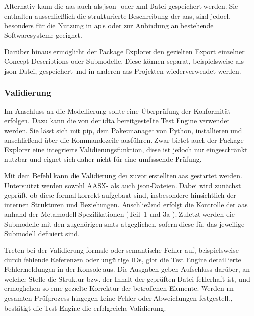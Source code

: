 Alternativ kann die \acs{aas} auch als \ac{json}- oder \ac{xml}-Datei gespeichert werden.
Sie enthalten ausschließlich die strukturierte Beschreibung der \acs{aas}, sind jedoch besonders für die Nutzung in \acsp{api} oder zur Anbindung an bestehende Softwaresysteme geeignet.

Darüber hinaus ermöglicht der Package Explorer den gezielten Export einzelner Concept Descriptions oder \mbox{Submodelle}.
Diese können separat, beispielsweise als \acs{json}-Datei, gespeichert und in anderen \acs{aas}-Projekten wiederverwendet werden.

\subsubsection{Validierung}

Im Anschluss an die Modellierung sollte eine Überprüfung der Konformität erfolgen. 
Dazu kann die von der \acs{idta} bereitgestellte Test Engine \cite{TestEngine} verwendet werden. 
Sie lässt sich mit pip, dem Paketmanager von Python, installieren und anschließend über die Kommandozeile ausführen. 
Zwar bietet auch der Package Explorer eine integrierte Validierungsfunktion, diese ist jedoch nur eingeschränkt nutzbar und eignet sich daher nicht für eine umfassende Prüfung.

Mit dem Befehl 
kann die Validierung der zuvor erstellten \acs{aas} gestartet werden.
Unterstützt werden sowohl AASX- als auch \acs{json}-Dateien. 
Dabei wird zunächst geprüft, ob diese formal korrekt aufgebaut sind, insbesondere hinsichtlich der internen Strukturen und Beziehungen. 
Anschließend erfolgt die Kontrolle der \acs{aas} anhand der Metamodell-Spezifikationen (Teil~1 \cite{SpezifikationPart1} und 3a \cite{SpezifikationPart3a}). 
Zuletzt werden die Submodelle mit den zugehörigen \acsp{smt} abgeglichen, sofern diese für das jeweilige Submodell definiert sind.

\newpage
Treten bei der Validierung formale oder semantische Fehler auf, beispielsweise durch fehlende Referenzen oder ungültige IDs, gibt die Test Engine detaillierte Fehlermeldungen in der Konsole aus. 
Die Ausgaben geben Aufschluss darüber, an welcher Stelle die Struktur bzw. der Inhalt der geprüften Datei fehlerhaft ist, und ermöglichen so eine gezielte Korrektur der betroffenen Elemente. 
Werden im gesamten Prüfprozess hingegen keine Fehler oder Abweichungen festgestellt, bestätigt die Test Engine die erfolgreiche Validierung.

